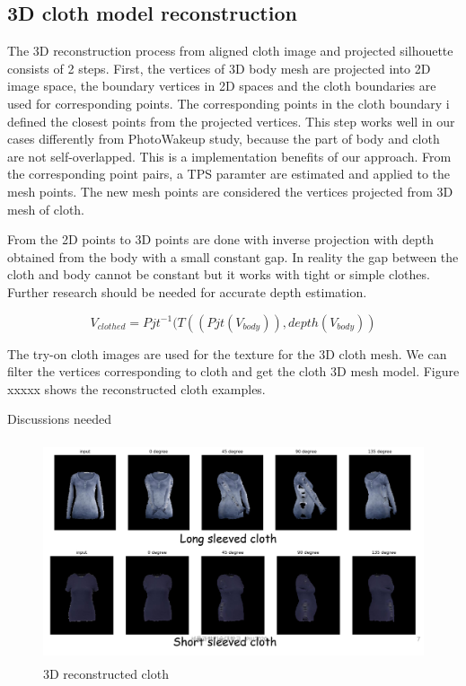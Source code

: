 \subsection{3D cloth model reconstruction }


The 3D reconstruction process from aligned cloth image and projected silhouette consists of 2 steps. First, the vertices of 3D body mesh are projected into 2D image space, the boundary  vertices in 2D spaces and the cloth boundaries are used for corresponding points. The corresponding points in the cloth boundary i defined the closest points from the projected vertices.  This step works well in our cases differently from PhotoWakeup study, because the part of body and cloth are not self-overlapped. This is a implementation benefits of our approach. From the corresponding point pairs, a TPS paramter are estimated and applied to the mesh points. The new mesh points are considered the vertices projected from 3D mesh of cloth.    

From the 2D points to 3D points are done with inverse projection with depth obtained from the body with a small constant gap. In reality the gap between the cloth and body cannot be constant but it works with tight or simple clothes. Further research should be needed for accurate depth estimation.   

\begin{equation}
V_{clothed} = Pjt^{-1} ( T( (Pjt(V_{body})), depth(V_{body}) )
\end{equation}


The try-on cloth images are used for the texture for the 3D cloth mesh. We can filter the vertices corresponding to cloth and get the cloth 3D mesh model. Figure xxxxx shows the reconstructed cloth examples. 


Discussions needed


\begin{figure}[t]
\centering
\includegraphics[height=6.5cm, scale=1]{figures/3dclothrecon.png}   %
\caption{3D reconstructed cloth}
\label{fig:3DreconstructedCloth}
\end{figure}



